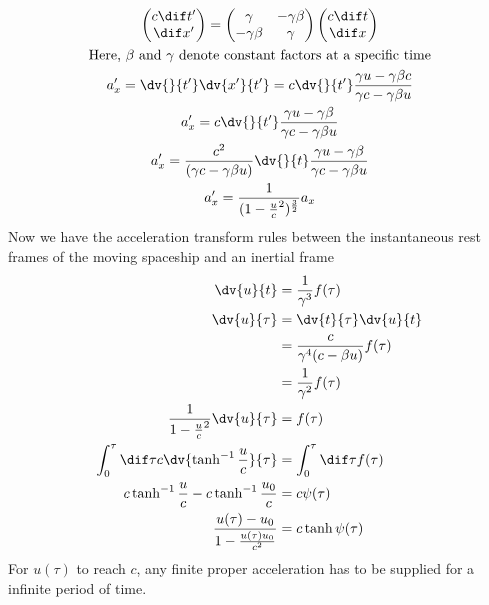 \documentclass[12pt]{article}
\begin{document}
            \subsubsection{} \begin{gather*}
                \begin{pmatrix}
                    c\dif t'\\
                    \dif x'
                \end{pmatrix}=\begin{pmatrix}
                    \gamma &-\gamma\beta\\
                    -\gamma\beta & \gamma
                \end{pmatrix}\begin{pmatrix}
                    c\dif t\\
                    \dif x
                \end{pmatrix}\\
                \text{Here, $\beta$ and $\gamma$ denote constant factors at a specific time}\\
                a_x' = \dv{}{t'}\dv{x'}{t'} = c \dv{}{t'} \frac{\gamma u - \gamma \beta c}{ \gamma c  - \gamma \beta u}\\
                a_x' = c\dv{}{t'} \frac{\gamma u - \gamma \beta }{ \gamma c  - \gamma \beta u}\\
                a_x' = \frac{c^2}{( \gamma c  - \gamma \beta u)} \dv{}{t}\frac{\gamma u - \gamma \beta }{ \gamma c  - \gamma \beta u}\\
                a_x' = \frac{1}{(1  - \frac{u}{c}^2)^\frac{3}{2}}a_x
            \end{gather*}
            Now we have the acceleration transform rules between the instantaneous rest frames of the moving spaceship and an inertial frame
            \begin{align*}
                \dv{u}{t} &=  \frac{1}{\gamma^3} f(\tau)\\
                \dv{u}{\tau} &= \dv{t}{\tau}\dv{u}{t}\\
                &= \frac{c}{\gamma^4 (c -\beta u)}f(\tau)\\
                &= \frac{1}{\gamma^2}f(\tau)\\
                \frac{1}{1 - \frac{u}{c}^2}\dv{u}{\tau} &=  f(\tau)\\
                \int_0^\tau \dif\tau c\dv{\tanh^{-1}\frac{u}{c}}{\tau} &= \int_0^\tau\dif\tau f(\tau)\\
                c\tanh^{-1}\frac{u}{c} - c\tanh^{-1}\frac{u_0}{c} &= c{\psi(\tau)}\\
                \frac{u(\tau) - u_0}{1 - \frac{u(\tau)u_0}{c^2}}&=  c\tanh \psi(\tau)
            \end{align*}
            For $u(\tau)$ to reach $c$, any finite proper acceleration has to be supplied for a infinite period of time.
\end{document}
